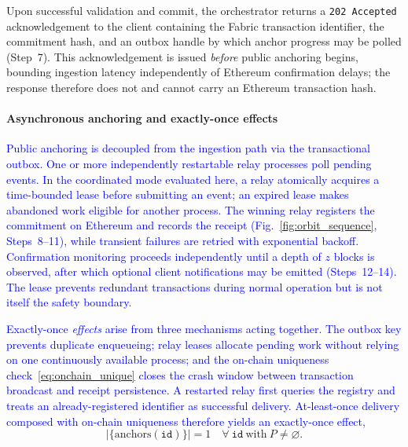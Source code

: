 \documentclass[final,5p,times,twocolumn]{elsarticle}
\begin{document}
Upon successful validation and commit, the orchestrator returns a \texttt{202~Accepted} acknowledgement to the client containing the Fabric transaction identifier, the commitment hash, and an outbox handle by which anchor progress may be polled (Step~7). This acknowledgement is issued \emph{before} public anchoring begins, bounding ingestion latency independently of Ethereum confirmation delays; the response therefore does not and cannot carry an Ethereum transaction hash.

\paragraph*{\textbf{Asynchronous anchoring and exactly-once effects}}
\textcolor{blue}{Public anchoring is decoupled from the ingestion path via the transactional outbox. One or more independently restartable relay processes poll pending events. In the coordinated mode evaluated here, a relay atomically acquires a time-bounded lease before submitting an event; an expired lease makes abandoned work eligible for another process. The winning relay registers the commitment on Ethereum and records the receipt (Fig.~\ref{fig:orbit_sequence}, Steps~8--11), while transient failures are retried with exponential backoff. Confirmation monitoring proceeds independently until a depth of $z$ blocks is observed, after which optional client notifications may be emitted (Steps~12--14). The lease prevents redundant transactions during normal operation but is not itself the safety boundary.}

\textcolor{blue}{Exactly-once \emph{effects} arise from three mechanisms acting together. The outbox key prevents duplicate enqueueing; relay leases allocate pending work without relying on one continuously available process; and the on-chain uniqueness check~\eqref{eq:onchain_unique} closes the crash window between transaction broadcast and receipt persistence. A restarted relay first queries the registry and treats an already-registered identifier as successful delivery. At-least-once delivery composed with on-chain uniqueness therefore yields an exactly-once effect,}
\begin{equation}
  \big|\{\text{anchors}(\texttt{id})\}\big| = 1
  \quad \forall\ \texttt{id} \ \text{with}\ P\neq\varnothing.
  \label{eq:exactly_once_effect}
\end{equation}
\end{document}
